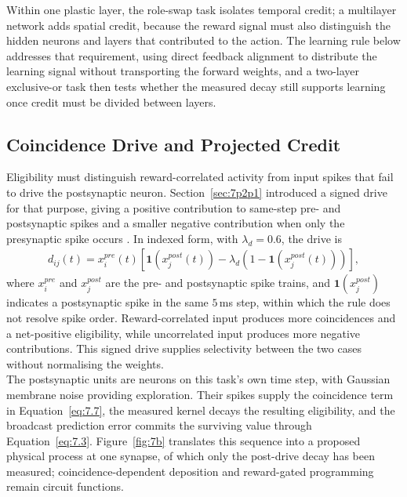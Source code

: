 \noindent Within one plastic layer, the role-swap task isolates temporal credit; a multilayer network adds spatial
credit, because the reward signal must also distinguish the hidden neurons and layers that contributed to the action.
The learning rule below addresses that requirement, using direct feedback alignment to distribute the
learning signal without transporting the forward weights, and a two-layer exclusive-or task then tests whether the
measured decay still supports learning once credit must be divided between layers.

\subsection[Coincidence Drive and Projected Credit]{Coincidence Drive and Projected Credit}
\label{sec:7p3p1}

\noindent Eligibility must distinguish reward-correlated activity from input spikes that fail to drive the
postsynaptic neuron. Section~\ref{sec:7p2p1} introduced a signed drive for that purpose, giving a positive contribution
to same-step pre- and postsynaptic spikes and a smaller negative contribution when only the presynaptic spike occurs
\cite{izhikevich2007solving}. In indexed form, with $\lambda_d=0.6$, the drive is
\begin{align}
    d_{ij}(t) = x^{pre}_i(t) \left[ \mathbf{1}\!\left( x^{post}_j(t) \right) - \lambda_d \left( 1 - \mathbf{1}\!\left( x^{post}_j(t) \right) \right) \right], \label{eq:7.7}
\end{align}
\noindent where $x^{pre}_i$ and $x^{post}_j$ are the pre- and postsynaptic spike trains, and
$\mathbf{1}(x^{post}_j)$ indicates a postsynaptic spike in the same $5$\,ms step, within which the rule does not resolve
spike order. Reward-correlated input produces more coincidences and a net-positive eligibility, while uncorrelated
input produces more negative contributions. This signed drive supplies selectivity between the two cases without
normalising the weights.\\

\noindent The postsynaptic units are  neurons on this task's own time step, with Gaussian membrane
noise providing exploration. Their spikes supply the coincidence term in Equation~\ref{eq:7.7}, the measured kernel
decays the resulting eligibility, and the broadcast prediction error commits the surviving value through
Equation~\ref{eq:7.3}. Figure~\ref{fig:7b} translates this sequence into a proposed physical process at one synapse, of
which only the post-drive decay has been measured; coincidence-dependent deposition and reward-gated programming remain
circuit functions.\\

